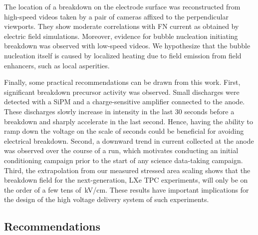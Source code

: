 The location of a breakdown on the electrode surface was reconstructed from high-speed videos taken by a pair of cameras affixed to the perpendicular viewports.
They show moderate correlations with FN current as obtained by electric field simulations.
Moreover, evidence for bubble nucleation initiating breakdown was observed with low-speed videos.
We hypothesize that the bubble nucleation itself is caused by localized heating due to field emission from field enhancers, such as local asperities. 

Finally, some practical recommendations can be drawn from this work.
First, significant breakdown precursor activity was observed.
Small discharges were detected with a SiPM and a charge-sensitive amplifier connected to the anode.
These discharges slowly increase in intensity in the last 30 seconds before a breakdown and sharply accelerate in the last second. Hence, having the ability to ramp down the voltage on the scale of seconds could be beneficial for avoiding electrical breakdown.
Second, a downward trend in current collected at the anode was observed over the course of a run, which motivates conducting an initial conditioning campaign prior to the start of any science data-taking campaign.
Third, the extrapolation from our measured stressed area scaling shows that the breakdown field for the next-generation, LXe TPC experiments, will only be on the order of a few tens of~kV/cm. 
These results have important implications for the design of the high voltage delivery system of such experiments. 
 
\subsection{Recommendations }

